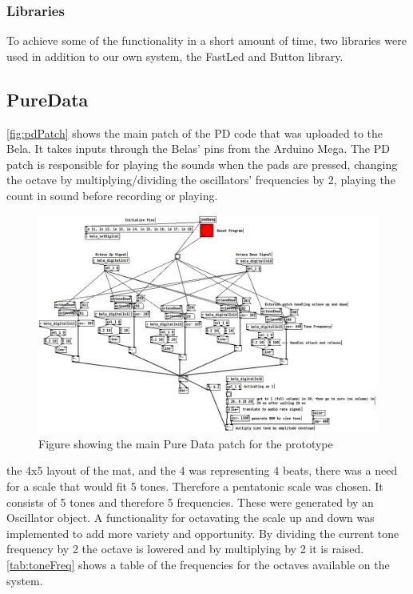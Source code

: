 		\subsubsection{Libraries}%
			To achieve some of the functionality in a short amount of time, two libraries were used in addition to our own system,
			the FastLed and Button library.
	\subsection{PureData}%
		\autoref{fig:pdPatch} shows the main patch of the PD code that was uploaded to the Bela. It takes inputs through the Belas' pins from the Arduino Mega. The PD patch is responsible for playing the sounds when the pads are pressed, changing the octave by multiplying/dividing the oscillators' frequencies by 2, playing the count in sound before recording or playing.
	
	\begin{figure}[H]
		\centering
		\includegraphics[width=1\linewidth]{figure/Implementation/pdPatch}
		\caption{Figure showing the main Pure Data patch for the prototype}
		\label{fig:pdPatch}
	\end{figure}
	the 4x5 layout of the mat, and the 4 was representing 4 beats, there was a need for a scale that would fit 5 tones. Therefore a pentatonic scale was chosen. It consists of 5 tones and therefore 5 frequencies. These were generated by an Oscillator object. A functionality for octavating the scale up and down was implemented to add more variety and opportunity. By dividing the current tone frequency by 2 the octave is lowered and by multiplying by 2 it is raised. \autoref{tab:toneFreq} shows a table of the frequencies for the octaves available on the system.
	
